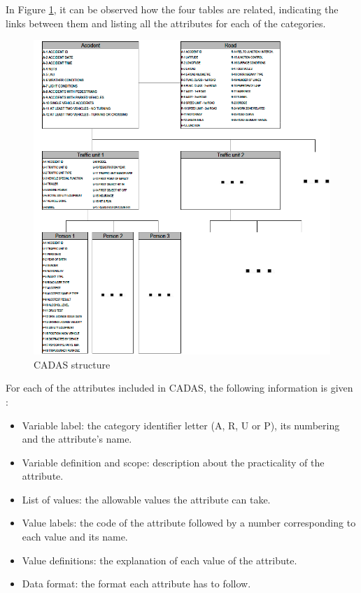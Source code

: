 In Figure \ref{fig:cadas}, it can be observed how the four tables are related, indicating the links between them and listing all the attributes for each of the categories. 

    
    \begin{figure}[H] 
    \captionsetup{justification=centering}
    \includegraphics[width=1.17\textwidth]{Images/cadas.png}
    \caption[CADAS structure]{CADAS structure \parencite{cadas}}
    \label{fig:cadas}
    \vspace{-0.5em}
    \end{figure}
    
For each of the attributes included in \ac{CADAS}, the following information is given \cite{cadas}:
\begin{itemize}
    \item Variable label: the category identifier letter (A, R, U or P), its numbering and the attribute's name. 
    \item Variable definition and scope: description about the practicality of the attribute.
    \item List of values: the allowable values the attribute can take.
    \item Value labels: the code of the attribute followed by a number corresponding to each value and its name.
    \item Value definitions: the explanation of each value of the attribute.
    \item Data format: the format each attribute has to follow. 
\end{itemize}

